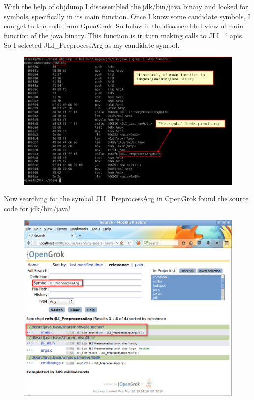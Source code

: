 \documentclass{article}
\begin{document}
With the help of objdump I disassembled the jdk/bin/java binary and looked for symbols, specifically in its main function. Once I know some candidate symbols, I can get to the code from OpenGrok. So below is the disassembled view of main function of the java binary. This function is in turn making calls to JLI\_* apis. So I selected JLI\_PreprocessArg as my candidate symbol.
\begin{figure}[H]
\centering
\includegraphics[width=\textwidth]{OpenJDK-5.png}
\caption{}
\end{figure}
Now searching for the symbol JLI\_PreprocessArg in OpenGrok found the source code for jdk/bin/java!
\begin{figure}[H]
\centering
\includegraphics[width=\textwidth]{OpenJDK-6.png}
\caption{}
\end{figure}
\end{document}
